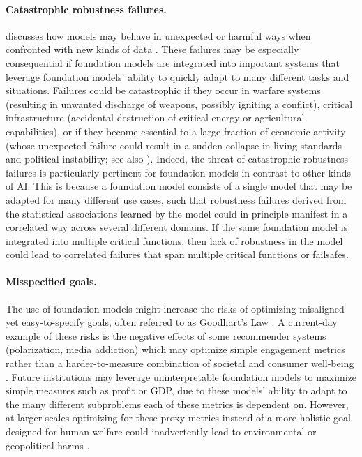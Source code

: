 \paragraph{Catastrophic robustness failures.}  discusses how models may behave in unexpected or harmful ways when confronted with new kinds of data \citep{amodei2016concrete, yudkowsky2008artificial}. These failures may be especially consequential if foundation models are integrated into important systems that leverage foundation models' ability to quickly adapt to many different tasks and situations. Failures could be catastrophic if they occur in warfare systems (resulting in unwanted discharge of weapons, possibly igniting a conflict), critical infrastructure (accidental destruction of critical energy or agricultural capabilities), or if they become essential to a large fraction of economic activity (whose unexpected failure could result in a sudden collapse in living standards and political instability; see also ). Indeed, the threat of catastrophic robustness failures is particularly pertinent for foundation models in contrast to other kinds of AI. This is because a foundation model consists of a single model that may be adapted for many different use cases, such that robustness failures derived from the statistical associations learned by the model could in principle manifest in a correlated way across several different domains. If the same foundation model is integrated into multiple critical functions, then lack of robustness in the model could lead to correlated failures that span multiple critical functions or failsafes.


\paragraph{Misspecified goals.} The use of foundation models might increase the risks of optimizing misaligned yet easy-to-specify goals, often referred to as Goodhart’s Law \citep{Kenton2021AlignmentOL, goodhart1984}. A current-day example of these risks is the negative effects of some recommender systems (\eg polarization, media addiction) which may optimize simple engagement metrics rather than a harder-to-measure combination of societal and consumer well-being \citep{burr2018analysis, milano2020recommender}. Future institutions may leverage uninterpretable foundation models to maximize simple measures such as profit or GDP, due to these models' ability to adapt to the many different subproblems each of these metrics is dependent on. However, at larger scales optimizing for these proxy metrics instead of a more holistic goal designed for human welfare could inadvertently lead to environmental or geopolitical harms \citep{ gabriel2020artificial, creel2021}.

